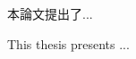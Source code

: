 \begin{abstractzh}

本論文提出了...

\end{abstractzh}

\begin{abstracten}

    This thesis presents ...

\end{abstracten}

